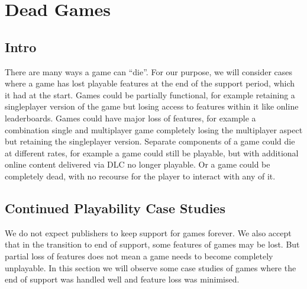 \chapter{Dead Games}\label{ch:evidence}

\section{Intro}
There are many ways a game can ``die''.
For our purpose, we will consider cases where a game has lost playable features at the end of the support period, which it had at the start.
Games could be partially functional, for example retaining a singleplayer version of the game but losing access to features within it like online leaderboards.
Games could have major loss of features, for example a combination single and multiplayer game completely losing the multiplayer aspect but retaining the singleplayer version.
Separate components of a game could die at different rates, for example a game could still be playable, but with additional online content delivered via DLC no longer playable.
Or a game could be completely dead, with no recourse for the player to interact with any of it.




\section{Continued Playability Case Studies}
We do not expect publishers to keep support for games forever.
We also accept that in the transition to end of support, some features of games may be lost.
But partial loss of features does not mean a game needs to become completely unplayable.
In this section we will observe some case studies of games where the end of support was handled well and feature loss was minimised.

